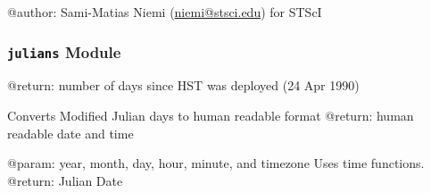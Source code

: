\documentclass[letterpaper,10pt,english]{sphinxmanual}
\begin{document}
@author: Sami-Matias Niemi (\href{mailto:niemi@stsci.edu}{niemi@stsci.edu}) for STScI


\begin{fulllineitems}
\label{SamPy.dates:SamPy.dates.NumberDate.print_day_number}
\end{fulllineitems}



\subsubsection{\texttt{julians} Module}
\label{SamPy.dates:julians-module}\label{SamPy.dates:module-SamPy.dates.julians}

\begin{fulllineitems}
\label{SamPy.dates:SamPy.dates.julians.HSTdayToRealDate}
\end{fulllineitems}



\begin{fulllineitems}
\label{SamPy.dates:SamPy.dates.julians.fromHSTDeployment}
@return: number of days since HST was deployed (24 Apr 1990)

\end{fulllineitems}



\begin{fulllineitems}
\label{SamPy.dates:SamPy.dates.julians.fromJulian}
Converts Modified Julian days to human readable format
@return: human readable date and time

\end{fulllineitems}



\begin{fulllineitems}
\label{SamPy.dates:SamPy.dates.julians.toJulian}
@param: 
year, month, day, hour, minute, and timezone 
Uses time functions.
@return: Julian Date

\end{fulllineitems}
\end{document}

